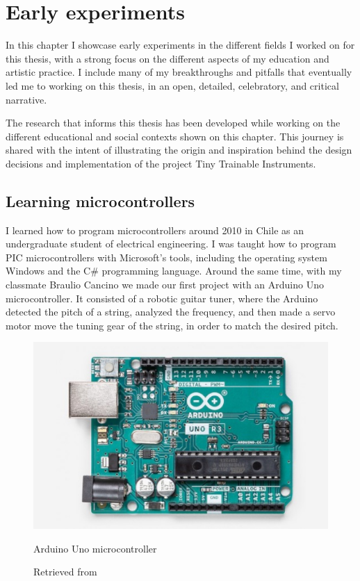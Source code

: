 \chapter{Early experiments}

In this chapter I showcase early experiments in the different fields I worked on for this thesis, with a strong focus on the different aspects of my education and artistic practice. I include many of my breakthroughs and pitfalls that eventually led me to working on this thesis, in an open, detailed, celebratory, and critical narrative.

The research that informs this thesis has been developed while working on the different educational and social contexts shown on this chapter. This journey is shared with the intent of illustrating the origin and inspiration behind the design decisions and implementation of the project Tiny Trainable Instruments.

\section{Learning microcontrollers}

I learned how to program microcontrollers around 2010 in Chile as an undergraduate student of electrical engineering. I was taught how to program PIC microcontrollers with Microsoft's tools, including the operating system Windows and the C\# programming language. Around the same time, with my classmate Braulio Cancino we made our first project with an Arduino Uno microcontroller. It consisted of a robotic guitar tuner, where the Arduino detected the pitch of a string, analyzed the frequency, and then made a servo motor move the tuning gear of the string, in order to match the desired pitch.

\begin{figure}[ht]
  \centering
  \includegraphics[width=0.75\linewidth,height=0.25\textheight,keepaspectratio]{images/arduino-uno.jpg}
  \caption{Arduino Uno microcontroller}
  \caption*{Retrieved from \cite{website-arduino-uno}}
  \label{fig:arduino-uno}
\end{figure}

